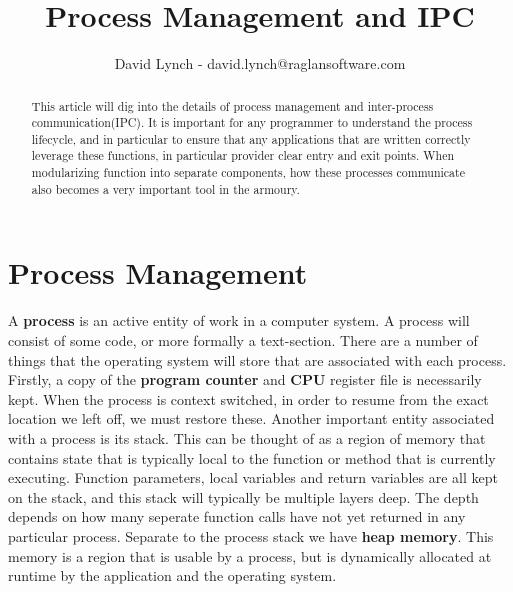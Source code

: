 \documentclass[10pt,a4paper]{article}
\title{Process Management and IPC}
\author{David Lynch - david.lynch@raglansoftware.com }
\begin{document}
\maketitle
\begin{abstract}
This article will dig into the details of process management and inter-process communication(IPC). It is important for any programmer to understand the process lifecycle, and in particular to ensure that any applications that are written correctly leverage these functions, in particular provider clear entry and exit points. When modularizing function into separate components, how these processes communicate also becomes a very important tool in the armoury.
\end{abstract}
\section{Process Management}
A {\bf process} is an active entity of work in a computer system. A process will consist of some code, or more formally a text-section. There are a number of things that the operating system will store that are associated with each process. Firstly, a copy of the {\bf program counter} and {\bf CPU} register file is necessarily kept. When the process is context switched, in order to resume from the exact location we left off, we must restore these. Another important entity associated with a process is its stack. This can be thought of as a region of memory that contains state that is typically local to the function or method that is currently executing. Function parameters, local variables and return variables are all kept on the stack, and this stack will typically be multiple layers deep. The depth depends on how many seperate function calls have not yet returned in any particular process. Separate to the process stack we have {\bf heap memory}. This memory is a region that is usable by a process, but is dynamically allocated at runtime by the application and the operating system.
\end{document}
